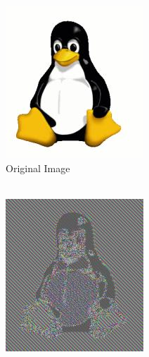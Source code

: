     \begin{figure}[htp!]
        \centering
        \begin{subfigure}[b]{0.3\textwidth}
            \centering
            \includegraphics[width=\textwidth]{img/Tux.jpg}
            \caption{Original Image\\~}
        \end{subfigure}
        \begin{subfigure}[b]{0.3\textwidth}
            \centering
            \includegraphics[width=\textwidth]{img/Tux_ecb.jpg}

\end{subfigure}
\end{figure}
